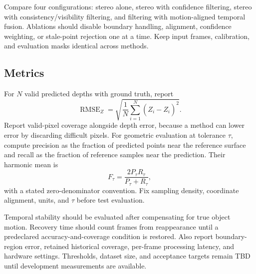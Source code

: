 Compare four configurations: stereo alone, stereo with confidence filtering, stereo with consistency/visibility filtering, and filtering with motion-aligned temporal fusion. Ablations should disable boundary handling, alignment, confidence weighting, or stale-point rejection one at a time. Keep input frames, calibration, and evaluation masks identical across methods.

\subsection{Metrics}
For $N$ valid predicted depths with ground truth, report
\begin{equation}
\operatorname{RMSE}_Z=\sqrt{\frac{1}{N}\sum_{i=1}^{N}(Z_i-\widehat Z_i)^2}.
\end{equation}
Report valid-pixel coverage alongside depth error, because a method can lower error by discarding difficult pixels. For geometric evaluation at tolerance $\tau$, compute precision as the fraction of predicted points near the reference surface and recall as the fraction of reference samples near the prediction. Their harmonic mean is
\begin{equation}
F_{\tau}=\frac{2P_{\tau}R_{\tau}}{P_{\tau}+R_{\tau}},
\end{equation}
with a stated zero-denominator convention. Fix sampling density, coordinate alignment, units, and $\tau$ before test evaluation.

Temporal stability should be evaluated after compensating for true object motion. Recovery time should count frames from reappearance until a predeclared accuracy-and-coverage condition is restored. Also report boundary-region error, retained historical coverage, per-frame processing latency, and hardware settings. Thresholds, dataset size, and acceptance targets remain TBD until development measurements are available.
